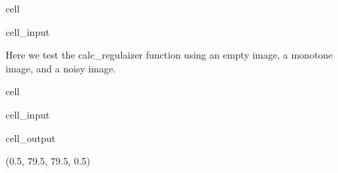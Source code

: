 \documentclass[letterpaper,10pt,english]{jupyterBook}
\begin{document}
\begin{sphinxuseclass}{cell}
\begin{sphinxVerbatimInput}
\begin{sphinxuseclass}{cell_input}
\end{sphinxuseclass}\end{sphinxVerbatimInput}

\end{sphinxuseclass}
\sphinxAtStartPar
Here we test the calc\_regulaizer function using an empty image, a monotone image, and a noisy image.

\begin{sphinxuseclass}{cell}\begin{sphinxVerbatimInput}

\begin{sphinxuseclass}{cell_input}
\begin{sphinxVerbatim}[commandchars=\\\{\}]
   
  
\end{sphinxVerbatim}

\end{sphinxuseclass}\end{sphinxVerbatimInput}
\begin{sphinxVerbatimOutput}

\begin{sphinxuseclass}{cell_output}
\begin{sphinxVerbatim}[commandchars=\\\{\}]
(\PYGZhy{}0.5, 79.5, 79.5, \PYGZhy{}0.5)
\end{sphinxVerbatim}

\noindent{}

\end{sphinxuseclass}\end{sphinxVerbatimOutput}

\end{sphinxuseclass}
\end{document}
